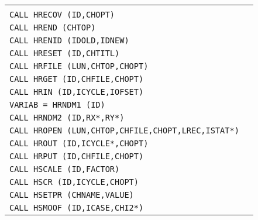 \begin{longtable}{|>{\tt}p{.9\linewidth}r|}
&                                                       \pageref{HREBIN} \\
CALL     HRECOV (ID,CHOPT)
&                                                       \pageref{HRECOV} \\
CALL     HREND  (CHTOP)                      
&                                                       \pageref{HREND}  \\
CALL     HRENID (IDOLD,IDNEW)
&                                                       \pageref{HRENID} \\
CALL     HRESET (ID,CHTITL)                  
&                                                       \pageref{HRESET} \\
CALL     HRFILE (LUN,CHTOP,CHOPT)            
&                                                       \pageref{HRFILE} \\
CALL     HRGET  (ID,CHFILE,CHOPT)            
&                                                       \pageref{HRGET}  \\
CALL     HRIN   (ID,ICYCLE,IOFSET)           
&                                                       \pageref{HRIN}   \\
VARIAB = HRNDM1 (ID)                         
&                                                       \pageref{HRNDM1} \\
CALL     HRNDM2 (ID,RX*,RY*)                 
&                                                       \pageref{HRNDM2} \\
CALL     HROPEN (LUN,CHTOP,CHFILE,CHOPT,LREC,ISTAT*)
&                                                       \pageref{HROPEN} \\
CALL     HROUT  (ID,ICYCLE*,CHOPT)           
&                                                       \pageref{HROUT}  \\
CALL     HRPUT  (ID,CHFILE,CHOPT)            
&                                                       \pageref{HRPUT}  \\
CALL     HSCALE (ID,FACTOR)                  
&                                                       \pageref{HSCALE} \\
CALL     HSCR   (ID,ICYCLE,CHOPT)            
&                                                       \pageref{HSCR}   \\
CALL     HSETPR (CHNAME,VALUE)               
&                                                       \pageref{HSETPR} \\
CALL     HSMOOF (ID,ICASE,CHI2*)             
&                                                       \pageref{HSMOOF} \\

\end{longtable}
